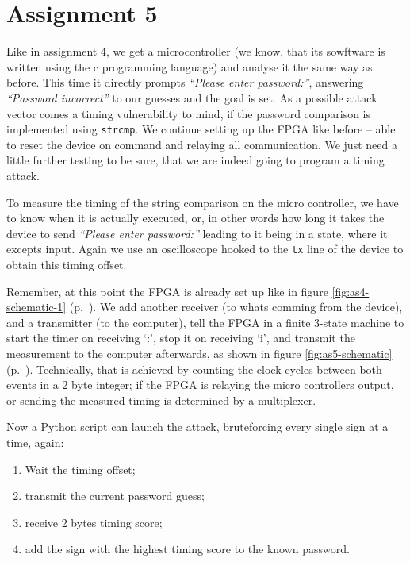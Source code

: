 \section*{Assignment 5}
%
% 

Like in assignment 4, we get a microcontroller (we know, that its sowftware is written using the c programming language) and analyse it the same way as before. 
This time it directly prompts \textit{``Please enter password:''}, answering \textit{``Password incorrect''} to our guesses and the goal is set. As a possible attack vector comes a timing vulnerability to mind, if the password comparison is implemented using \texttt{strcmp}. We continue setting up the FPGA like before -- able to reset the device on command and relaying all communication. We just need a little further testing to be sure, that we are indeed going to program a timing attack.

To measure the timing of the string comparison on the micro controller, we have to know when it is actually executed, or, in other words how long it takes the device to send \textit{``Please enter password:''} leading to it being in a state, where it excepts input. 
Again we use an oscilloscope hooked to the \texttt{tx} line of the device to obtain this timing offset. 

Remember, at this point the FPGA is already set up like in figure \ref{fig:as4-schematic-1} (p.~\pageref{fig:as4-schematic-1}).
We add another receiver (to whats comming from the device), and a transmitter (to the computer), tell the FPGA in a finite 3-state machine to start the timer on receiving `:', stop it on receiving `i', and transmit the measurement to the computer afterwards, as shown in figure \ref{fig:as5-schematic} (p.~\pageref{fig:as5-schematic}). Technically, that is achieved by counting the clock cycles between both events in a 2 byte integer; if the FPGA is relaying the micro controllers output, or sending the measured timing is determined by a multiplexer.

Now a Python script can launch the attack, bruteforcing every single sign at a time, again:

\begin{enumerate}
    \item Wait the timing offset;
    \item transmit the current password guess;
    \item receive 2 bytes timing score;
    \item add the sign with the highest timing score to the known password.
\end{enumerate}

